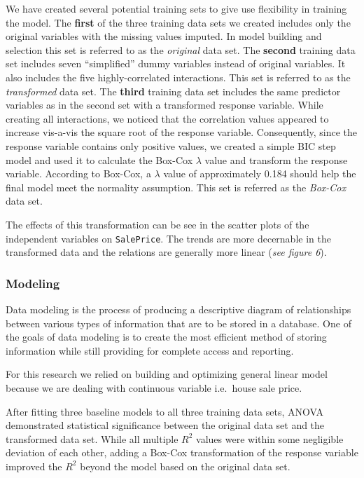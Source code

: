 \documentclass[
]{article}
\begin{document}
We have created several potential training sets to give use flexibility
in training the model. The \textbf{first} of the three training data
sets we created includes only the original variables with the missing
values imputed. In model building and selection this set is referred to
as the \emph{original} data set. The \textbf{second} training data set
includes seven ``simplified'' dummy variables instead of original
variables. It also includes the five highly-correlated interactions.
This set is referred to as the \emph{transformed} data set. The
\textbf{third} training data set includes the same predictor variables
as in the second set with a transformed response variable. While
creating all interactions, we noticed that the correlation values
appeared to increase vis-a-vis the square root of the response variable.
Consequently, since the response variable contains only positive values,
we created a simple BIC step model and used it to calculate the Box-Cox
\(\lambda\) value and transform the response variable. According to
Box-Cox, a \(\lambda\) value of approximately 0.184 should help the
final model meet the normality assumption. This set is referred as the
\emph{Box-Cox} data set.

The effects of this transformation can be see in the scatter plots of
the independent variables on \texttt{SalePrice}. The trends are more
decernable in the transformed data and the relations are generally more
linear (\emph{see figure 6}).

\hypertarget{modeling}{%
\subsubsection{Modeling}\label{modeling}}

Data modeling is the process of producing a descriptive diagram of
relationships between various types of information that are to be stored
in a database. One of the goals of data modeling is to create the most
efficient method of storing information while still providing for
complete access and reporting.

For this research we relied on building and optimizing general linear
model because we are dealing with continuous variable i.e.~house sale
price.

After fitting three baseline models to all three training data sets,
ANOVA demonstrated statistical significance between the original data
set and the transformed data set. While all multiple \(R^2\) values were
within some negligible deviation of each other, adding a Box-Cox
transformation of the response variable improved the \(R^2\) beyond the
model based on the original data set.
\end{document}
